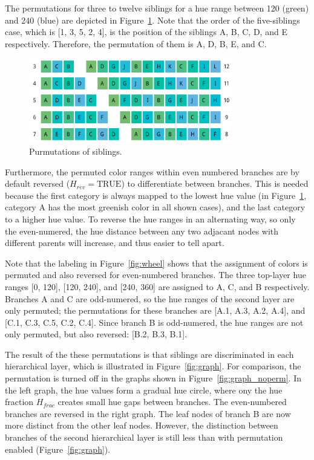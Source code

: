 \documentclass[journal]{vgtc}                %
\begin{document}
The permutations for three to twelve siblings for a hue range between 120 (green) and 240 (blue) are depicted in Figure~\ref{fig:perm}. Note that the order of the five-siblings case, which is [1, 3, 5, 2, 4], is the position of the siblings A, B, C, D, and E respectively. Therefore, the permutation of them is A, D, B, E, and C. 

\begin{figure}[tb]
  \centering
  \includegraphics[width=3.5in]{Permutations.pdf}
  \caption{Purmutations of siblings.}\label{fig:perm}
\end{figure}


Furthermore, the permuted color ranges within even numbered branches are by default reversed ($H_{rev}=\mbox{TRUE}$) to differentiate between branches. This is needed because the first category is always mapped to the lowest hue value (in Figure~\ref{fig:perm}, category A has the most greenish color in all shown cases), and the last category to a higher hue value. To reverse the hue ranges in an alternating way, so only the even-numered, the hue distance between any two adjacant nodes with different parents will increase, and thus easier to tell apart. 

Note that the labeling in Figure~\ref{fig:wheel} shows that the assignment of colors is permuted and also reversed for even-numbered branches. The three top-layer hue ranges [0, 120], [120, 240], and [240, 360] are assigned to A, C, and B respectively. Branches A and C are odd-numered, so the hue ranges of the second layer are only permuted; the permutations for these branches are [A.1, A.3, A.2, A.4], and [C.1, C.3, C.5, C.2, C.4]. Since branch B is odd-numered, the hue ranges are not only permuted, but also reversed: [B.2, B.3, B.1].

The result of the these permutations is that siblings are discriminated in each hierarchical layer, which is illustrated in Figure~\ref{fig:graph}. For comparison, the permutation is turned off in the graphs shown in Figure~\ref{fig:graph_noperm}. In the left graph, the hue values form a gradual hue circle, where ony the hue fraction $H_{frac}$ creates small hue gaps between branches. The even-numbered branches are reversed in the right graph. The leaf nodes of branch B are now more distinct from the other leaf nodes. However, the distinction between branches of the second hierarchical layer is still less than with permutation enabled (Figure~\ref{fig:graph}).
\end{document}
